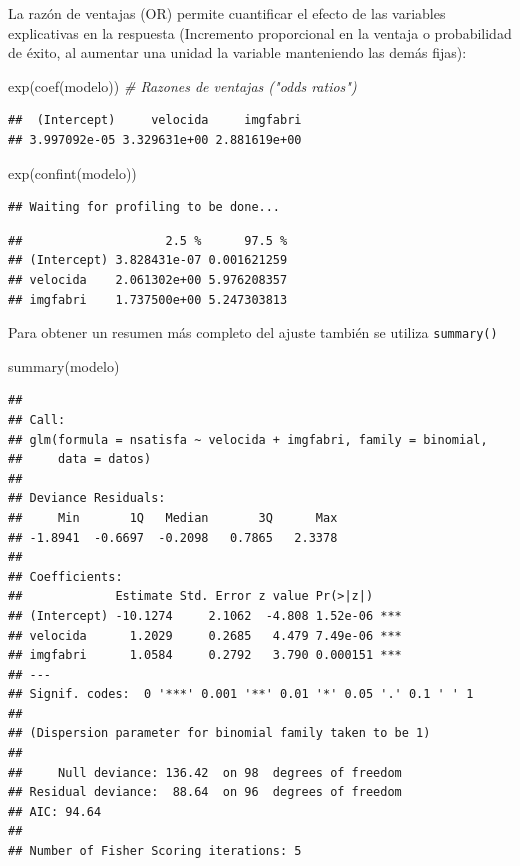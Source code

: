 \documentclass[
]{book}
\newenvironment{Shaded}{\begin{snugshade}}{\end{snugshade}}
\newcommand{\CommentTok}[1]{\textcolor[rgb]{0.56,0.35,0.01}{\textit{#1}}}
\newcommand{\FunctionTok}[1]{\textcolor[rgb]{0.00,0.00,0.00}{#1}}
\newcommand{\NormalTok}[1]{#1}
\theoremstyle{break}
\theoremstyle{nonumberplain}
\begin{document}
La razón de ventajas (OR) permite cuantificar el efecto de las variables explicativas en la respuesta
(Incremento proporcional en la ventaja o probabilidad de éxito, al aumentar una unidad la variable manteniendo las demás fijas):

\begin{Shaded}
\begin{Highlighting}[]
\FunctionTok{exp}\NormalTok{(}\FunctionTok{coef}\NormalTok{(modelo))  }\CommentTok{\# Razones de ventajas ("odds ratios")}
\end{Highlighting}
\end{Shaded}

\begin{verbatim}
##  (Intercept)     velocida     imgfabri 
## 3.997092e-05 3.329631e+00 2.881619e+00
\end{verbatim}

\begin{Shaded}
\begin{Highlighting}[]
\FunctionTok{exp}\NormalTok{(}\FunctionTok{confint}\NormalTok{(modelo))}
\end{Highlighting}
\end{Shaded}

\begin{verbatim}
## Waiting for profiling to be done...
\end{verbatim}

\begin{verbatim}
##                    2.5 %      97.5 %
## (Intercept) 3.828431e-07 0.001621259
## velocida    2.061302e+00 5.976208357
## imgfabri    1.737500e+00 5.247303813
\end{verbatim}

Para obtener un resumen más completo del ajuste también se utiliza \texttt{summary()}

\begin{Shaded}
\begin{Highlighting}[]
\FunctionTok{summary}\NormalTok{(modelo)}
\end{Highlighting}
\end{Shaded}

\begin{verbatim}
## 
## Call:
## glm(formula = nsatisfa ~ velocida + imgfabri, family = binomial, 
##     data = datos)
## 
## Deviance Residuals: 
##     Min       1Q   Median       3Q      Max  
## -1.8941  -0.6697  -0.2098   0.7865   2.3378  
## 
## Coefficients:
##             Estimate Std. Error z value Pr(>|z|)    
## (Intercept) -10.1274     2.1062  -4.808 1.52e-06 ***
## velocida      1.2029     0.2685   4.479 7.49e-06 ***
## imgfabri      1.0584     0.2792   3.790 0.000151 ***
## ---
## Signif. codes:  0 '***' 0.001 '**' 0.01 '*' 0.05 '.' 0.1 ' ' 1
## 
## (Dispersion parameter for binomial family taken to be 1)
## 
##     Null deviance: 136.42  on 98  degrees of freedom
## Residual deviance:  88.64  on 96  degrees of freedom
## AIC: 94.64
## 
## Number of Fisher Scoring iterations: 5
\end{verbatim}
\end{document}
